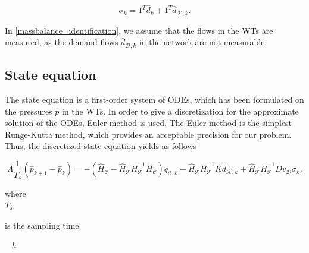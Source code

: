 \begin{equation}
\label{massbalance_identification}
 \sigma_k = 1^T \hat{d}_k + 1^T \bar{d}_{\mathcal{K},k}.
\end{equation}

 In \eqref{massbalance_identification}, we assume that the flows in the WTs are measured, as the demand flows $\bar{d}_{\mathcal{D},k} $ in the network are not measurable. 


 \subsection{State equation}
\label{state_eq_identification} 

The state equation is a first-order system of ODEs, which has been formulated on the pressures $\hat{p}$ in the WTs. In order to give a discretization for the approximate solution of the ODEs, Euler-method is used. The Euler-method is the simplest Runge-Kutta method, which provides an acceptable precision for our problem\cite{chicone2006ordinary}. Thus, the discretized state equation yields as follows

\begin{equation}
  \label{WT_matrixform_final_discrete}
\Lambda \frac{1}{T_s} (\hat{p}_{k+1} - \hat{p}_k)  = - (\hat{H}_{\mathcal{C}} - \hat{H}_{\mathcal{T}} \bar{H}^{-1}_{\mathcal{T}}\bar{H}_{\mathcal{C}})  q_{\mathcal{C},k} - \hat{H}_{\mathcal{T}} \bar{H}^{-1}_{\mathcal{T}} K \bar{d}_{\mathcal{K},k} + \hat{H}_{\mathcal{T}} \bar{H}^{-1}_{\mathcal{T}} D v_{\mathcal{D}} \sigma_k.
\end{equation}

\begin{minipage}[t]{0.20\textwidth}
where\\
\hspace*{8mm} $T_s$
\end{minipage}
\begin{minipage}[t]{0.68\textwidth}
\vspace*{2mm}
 is the sampling time.
\end{minipage}
\begin{minipage}[t]{0.10\textwidth}
\vspace*{2mm}
\textcolor{White}{te}$\unit{h}$
\end{minipage} 

